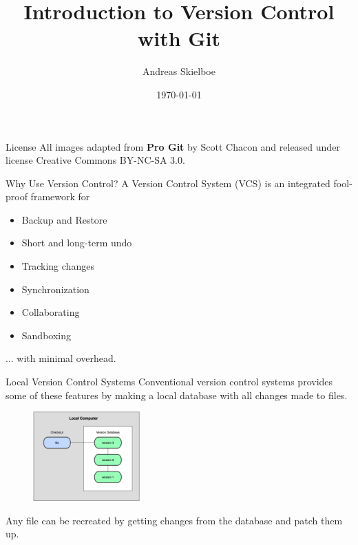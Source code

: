 \documentclass{beamer}
\title[Git - Version Control System]{Introduction  to Version Control with Git}
\author{Andreas Skielboe}
\institute{Dark Cosmology Centre \\ Niels Bohr Institute}
\date{\today}
\def \figureHeight {130px}
\begin{document}
\begin{frame}
	\titlepage
\end{frame}

\begin{frame}{License}
	All images adapted from {\bf Pro Git} by Scott Chacon and released under license Creative Commons BY-NC-SA 3.0.
\end{frame}

\begin{frame}{Why Use Version Control?}
	A Version Control System (VCS) is an integrated fool-proof framework for
	\begin{itemize}
		\item Backup and Restore
		\item Short and long-term undo
		\item Tracking changes
		\item Synchronization
		\item Collaborating
		\item Sandboxing
	\end{itemize}
	... with minimal overhead.
\end{frame}

\begin{frame}{Local Version Control Systems}
	Conventional version control systems provides some of these features by making a local database with all changes made to files.
	\begin{figure}
		\includegraphics[height=\figureHeight]{images/local-version-control.png}
	\end{figure}
	Any file can be recreated by getting changes from the database and patch them up.
\end{frame}
\end{document}
